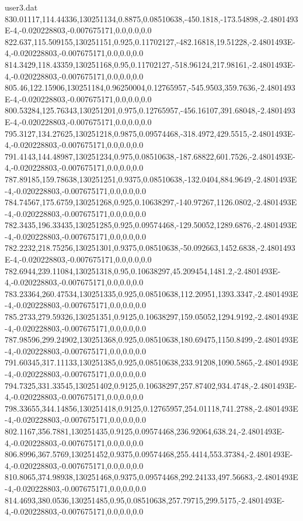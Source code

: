 \begin{filecontents}{user3.dat}
830.01117,114.44336,130251134,0.8875,0.08510638,-450.1818,-173.54898,-2.4801493E-4,-0.020228803,-0.007675171,0.0,0.0,0.0
822.637,115.509155,130251151,0.925,0.11702127,-482.16818,19.51228,-2.4801493E-4,-0.020228803,-0.007675171,0.0,0.0,0.0
814.3429,118.43359,130251168,0.95,0.11702127,-518.96124,217.98161,-2.4801493E-4,-0.020228803,-0.007675171,0.0,0.0,0.0
805.46,122.15906,130251184,0.96250004,0.12765957,-545.9503,359.7636,-2.4801493E-4,-0.020228803,-0.007675171,0.0,0.0,0.0
800.53284,125.76343,130251201,0.975,0.12765957,-456.16107,391.68048,-2.4801493E-4,-0.020228803,-0.007675171,0.0,0.0,0.0
795.3127,134.27625,130251218,0.9875,0.09574468,-318.4972,429.5515,-2.4801493E-4,-0.020228803,-0.007675171,0.0,0.0,0.0
791.4143,144.48987,130251234,0.975,0.08510638,-187.68822,601.7526,-2.4801493E-4,-0.020228803,-0.007675171,0.0,0.0,0.0
787.89185,159.78638,130251251,0.9375,0.08510638,-132.0404,884.9649,-2.4801493E-4,-0.020228803,-0.007675171,0.0,0.0,0.0
784.74567,175.6759,130251268,0.925,0.10638297,-140.97267,1126.0802,-2.4801493E-4,-0.020228803,-0.007675171,0.0,0.0,0.0
782.3435,196.33435,130251285,0.925,0.09574468,-129.50052,1289.6876,-2.4801493E-4,-0.020228803,-0.007675171,0.0,0.0,0.0
782.2232,218.75256,130251301,0.9375,0.08510638,-50.092663,1452.6838,-2.4801493E-4,-0.020228803,-0.007675171,0.0,0.0,0.0
782.6944,239.11084,130251318,0.95,0.10638297,45.209454,1481.2,-2.4801493E-4,-0.020228803,-0.007675171,0.0,0.0,0.0
783.23364,260.47534,130251335,0.925,0.08510638,112.20951,1393.3347,-2.4801493E-4,-0.020228803,-0.007675171,0.0,0.0,0.0
785.2733,279.59326,130251351,0.9125,0.10638297,159.05052,1294.9192,-2.4801493E-4,-0.020228803,-0.007675171,0.0,0.0,0.0
787.98596,299.24902,130251368,0.925,0.08510638,180.69475,1150.8499,-2.4801493E-4,-0.020228803,-0.007675171,0.0,0.0,0.0
791.60345,317.11133,130251385,0.925,0.08510638,233.91208,1090.5865,-2.4801493E-4,-0.020228803,-0.007675171,0.0,0.0,0.0
794.7325,331.33545,130251402,0.9125,0.10638297,257.87402,934.4748,-2.4801493E-4,-0.020228803,-0.007675171,0.0,0.0,0.0
798.33655,344.14856,130251418,0.9125,0.12765957,254.01118,741.2788,-2.4801493E-4,-0.020228803,-0.007675171,0.0,0.0,0.0
802.1167,356.7881,130251435,0.9125,0.09574468,236.92064,638.24,-2.4801493E-4,-0.020228803,-0.007675171,0.0,0.0,0.0
806.8996,367.5769,130251452,0.9375,0.09574468,255.4414,553.37384,-2.4801493E-4,-0.020228803,-0.007675171,0.0,0.0,0.0
810.8065,374.98938,130251468,0.9375,0.09574468,292.24133,497.56683,-2.4801493E-4,-0.020228803,-0.007675171,0.0,0.0,0.0
814.4693,380.0536,130251485,0.95,0.08510638,257.79715,299.5175,-2.4801493E-4,-0.020228803,-0.007675171,0.0,0.0,0.0

\end{filecontents}
